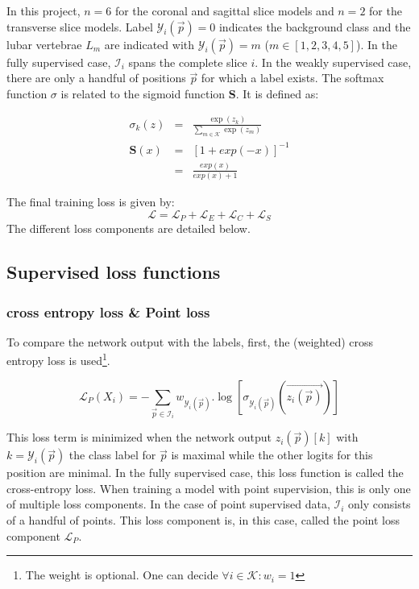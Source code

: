 \par{
    In this project, $n=6$ for the coronal and sagittal slice models and $n=2$ for the transverse slice models. 
    Label $\mathcal{Y}_i(\vec{p})=0$ indicates the background class and the lubar vertebrae $L_m$ are indicated with $\mathcal{Y}_i(\vec{p})=m$ ($m\in[1,2,3,4,5]$).
    In the fully supervised case, $\mathcal{I}_i$ spans the complete slice $i$. In the weakly supervised case, there are only a handful of positions $\vec{p}$ for which a label exists.
}
The softmax function $\sigma$ is related to the sigmoid function $\mathbf{S}$. It is defined as:

\begin{eqnarray}
    \sigma_k(z) &=& \frac{\exp(z_k)}{\sum_{m\in\mathcal{K}} \exp(z_m)} \\
    \mathbf{S}(x) &=& \left[ 1+ exp(-x) \right]^{-1} \\ &=& \frac{exp(x)}{exp(x) + 1} 
\end{eqnarray}

The final training loss is given by:
\begin{equation}
    \mathcal{L} = \mathcal{L}_P + \mathcal{L}_E + \mathcal{L}_C + \mathcal{L}_S
\end{equation}
The different loss components are detailed below.

\subsection{Supervised loss functions}

\subsubsection{cross entropy loss \& Point loss \label{sec:crossentropy}}
To compare the network output with the labels, first, the (weighted) cross entropy loss is used\footnote{The weight is optional. One can decide $\forall i\in\mathcal{K}: w_i=1$}.

\begin{equation}
\mathcal{L}_P(X_i) = -\sum_{\vec{p} \in \mathcal{I}_i} w_{\mathcal{Y}_i(\vec{p})}.\log\left[\sigma_{\mathcal{Y}_i(\vec{p})}\left(\vec{z_i(\vec{p})}\right)\right]
\label{eq:LP}
\end{equation}

This loss term is minimized when the network output $z_i(\vec{p})[k]$ with $k=\mathcal{Y}_i(\vec{p})$ the class label for $\vec{p}$ is maximal while the other logits for this position are minimal.
In the fully supervised case, this loss function is called the cross-entropy loss. 
When training a model with point supervision, this is only one of multiple loss components. 
In the case of point supervised data, $\mathcal{I}_i$ only consists of a handful of points.
This loss component is, in this case, called the point loss component $\mathcal{L}_P$.

